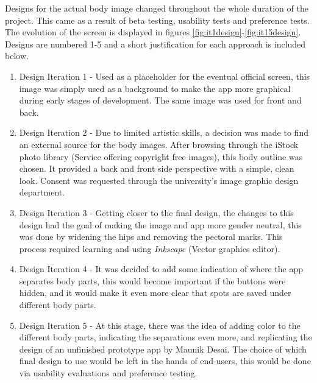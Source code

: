 Designs for the actual body image changed throughout the whole duration of the project. This came as a result of beta testing, usability tests and preference tests. The evolution of the screen is displayed in figures \ref{fig:it1design}-\ref{fig:it15design}. Designs are numbered 1-5 and a short justification for each approach is included below.
\begin{enumerate}
    \item Design Iteration 1 - Used as a placeholder for the eventual official screen, this image was simply used as a background to make the app more graphical during early stages of development. The same image was used for front and back.
    \item Design Iteration 2 - Due to limited artistic skills, a decision was made to find an external source for the body images. After browsing through the iStock photo library (Service offering copyright free images), this body outline was chosen. It provided a back and front side perspective with a simple, clean look. Consent was requested through the university's image graphic design department.
    \item Design Iteration 3 - Getting closer to the final design, the changes to this design had the goal of making the image and app more gender neutral, this was done by widening the hips and removing the pectoral marks. This process required learning and using \emph{Inkscape} (Vector graphics editor).
    \item Design Iteration 4 - It was decided to add some indication of where the app separates body parts, this would become important if the buttons were hidden, and it would make it even more clear that spots are saved under different body parts.
    \item Design Iteration 5 - At this stage, there was the idea of adding color to the different body parts, indicating the separations even more, and replicating the design of an unfinished prototype app by Maunik Desai. The choice of which final design to use would be left in the hands of end-users, this would be done via usability evaluations and preference testing.
\end{enumerate}

